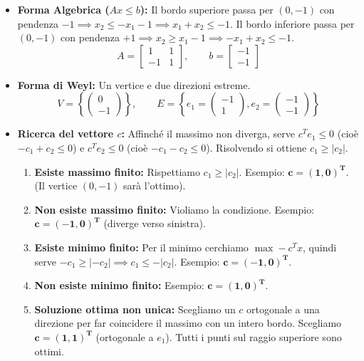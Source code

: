 \documentclass[12pt, a4paper]{article}
\begin{document}
	\begin{itemize}[label=\textcolor{titlecolor}{\Large\textbullet}, itemsep=4pt, leftmargin=1.5cm]
		\item \textbf{Forma Algebrica ($Ax \leq b$):} Il bordo superiore passa per $(0,-1)$ con pendenza $-1 \implies x_2 \leq -x_1 - 1 \implies x_1 + x_2 \leq -1$. Il bordo inferiore passa per $(0,-1)$ con pendenza $+1 \implies x_2 \geq x_1 - 1 \implies -x_1 + x_2 \leq -1$.
		\[
		A = \begin{bmatrix} 1 & 1 \\ -1 & 1 \end{bmatrix}, \qquad b = \begin{bmatrix} -1 \\ -1 \end{bmatrix}
		\]
		\item \textbf{Forma di Weyl:} Un vertice e due direzioni estreme.
		\[
		V = \left\{ \begin{pmatrix} 0 \\ -1 \end{pmatrix} \right\}, \qquad E = \left\{ e_1=\begin{pmatrix} -1 \\ 1 \end{pmatrix}, e_2=\begin{pmatrix} -1 \\ -1 \end{pmatrix} \right\}
		\]
		\item \textbf{Ricerca del vettore $c$:} Affinché il massimo non diverga, serve $c^T e_1 \leq 0$ (cioè $-c_1 + c_2 \leq 0$) e $c^T e_2 \leq 0$ (cioè $-c_1 - c_2 \leq 0$). Risolvendo si ottiene $c_1 \geq |c_2|$.
		\begin{enumerate}[label=\alph*)]
			\item \textbf{Esiste massimo finito:} Rispettiamo $c_1 \geq |c_2|$. Esempio: $\mathbf{c = (1, 0)^T}$. (Il vertice $(0,-1)$ sarà l'ottimo).
			\item \textbf{Non esiste massimo finito:} Violiamo la condizione. Esempio: $\mathbf{c = (-1, 0)^T}$ (diverge verso sinistra).
			\item \textbf{Esiste minimo finito:} Per il minimo cerchiamo $\max -c^T x$, quindi serve $-c_1 \geq |-c_2| \implies c_1 \leq -|c_2|$. Esempio: $\mathbf{c = (-1, 0)^T}$.
			\item \textbf{Non esiste minimo finito:} Esempio: $\mathbf{c = (1, 0)^T}$.
			\item \textbf{Soluzione ottima non unica:} Scegliamo un $c$ ortogonale a una direzione per far coincidere il massimo con un intero bordo. Scegliamo $\mathbf{c = (1, 1)^T}$ (ortogonale a $e_1$). Tutti i punti sul raggio superiore sono ottimi.
		\end{enumerate}
	\end{itemize}
	
\end{document}
